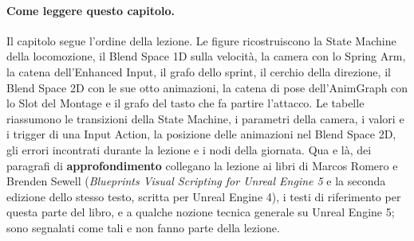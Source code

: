 \paragraph{Come leggere questo capitolo.} Il capitolo segue l'ordine della lezione. Le
figure ricostruiscono la State Machine della locomozione, il Blend Space 1D sulla
velocità, la camera con lo Spring Arm, la catena dell'Enhanced Input, il grafo dello
sprint, il cerchio della direzione, il Blend Space 2D con le sue otto animazioni, la
catena di pose dell'AnimGraph con lo Slot del Montage e il grafo del tasto che fa
partire l'attacco. Le tabelle riassumono le transizioni della State Machine, i
parametri della camera, i valori e i trigger di una Input Action, la posizione delle
animazioni nel Blend Space 2D, gli errori incontrati durante la lezione e i nodi della
giornata. Qua e là, dei paragrafi di \textbf{approfondimento} collegano la lezione ai
libri di Marcos Romero e Brenden Sewell (\emph{Blueprints Visual Scripting for Unreal
Engine 5} e la seconda edizione dello stesso testo, scritta per Unreal Engine 4), i
testi di riferimento per questa parte del libro, e a qualche nozione tecnica generale su
Unreal Engine 5; sono segnalati come tali e non fanno parte della lezione.

